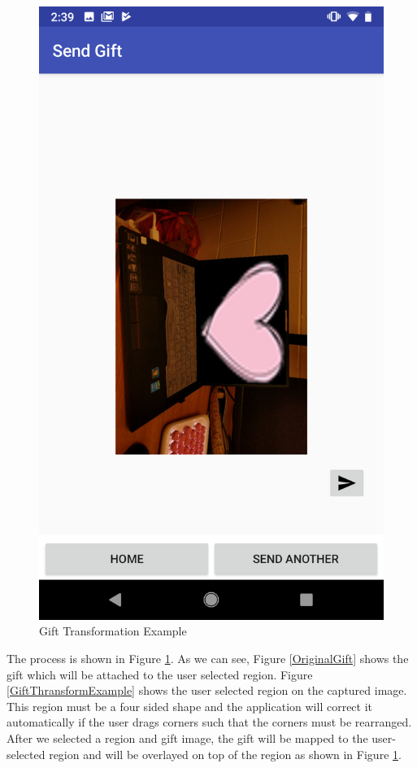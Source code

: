 \begin{figure}[htb]
\begin{minipage}[H]{0.3\textwidth}
\includegraphics[width=.95\textwidth]{section04/assets/AttachedGift.png}
\subcaption{\label{AttachedGift}}
\end{minipage}%
\caption[Gift Transformation Example]{\label{GiftTransformationExample}Gift Transformation Example}
\end{figure}
\par The process is shown in Figure \ref{GiftTransformationExample}. As we can see, Figure \ref{OriginalGift} shows the gift which will be attached to the user selected region. Figure \ref{GiftThransformExample} shows the user selected region on the captured image. This region must be a four sided shape and the application will correct it automatically if the user drags corners such that the corners must be rearranged. After we selected a region and gift image, the gift will be mapped to the user-selected region and will be overlayed on top of the region as shown in Figure \ref{GiftTransformationExample}.
